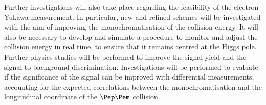 Further investigations will also take place regarding the feasibility of the electron Yukawa measurement.
In particular, new and refined schemes will be investigated with the aim of improving the monochromatisation of the collision energy.
It will also be necessary to develop and simulate a procedure to monitor and adjust the collision energy in real time, 
to ensure that it remains centred at the Higgs pole.   
Further physics studies will be performed to improve the signal yield and the signal-to-background discrimination.  
Investigations will be performed to evaluate if the significance of the signal can be improved with differential measurements, 
accounting for the expected correlations between the monochromatisation and the longitudinal coordinate of the $\epem$ collision.